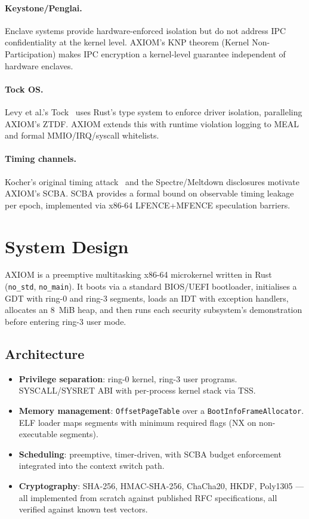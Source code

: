 \documentclass[10pt,twocolumn]{article}
\begin{document}
\paragraph{Keystone/Penglai.} Enclave systems provide hardware-enforced
isolation but do not address IPC confidentiality at the kernel level.
AXIOM's KNP theorem (Kernel Non-Participation) makes IPC encryption a
kernel-level guarantee independent of hardware enclaves.

\paragraph{Tock OS.} Levy et al.'s Tock~\cite{levy2017multiprogramming}
uses Rust's type system to enforce driver isolation, paralleling AXIOM's
ZTDF. AXIOM extends this with runtime violation logging to MEAL and
formal MMIO/IRQ/syscall whitelists.

\paragraph{Timing channels.} Kocher's original timing attack~\cite{kocher1996timing}
and the Spectre/Meltdown disclosures motivate AXIOM's SCBA. SCBA provides
a formal bound on observable timing leakage per epoch, implemented via
x86-64 LFENCE+MFENCE speculation barriers.

\section{System Design}

AXIOM is a preemptive multitasking x86-64 microkernel written in Rust
(\texttt{no\_std}, \texttt{no\_main}). It boots via a standard BIOS/UEFI
bootloader, initialises a GDT with ring-0 and ring-3 segments, loads an IDT
with exception handlers, allocates an 8~MiB heap, and then runs each security
subsystem's demonstration before entering ring-3 user mode.

\subsection{Architecture}

\begin{itemize}
  \item \textbf{Privilege separation}: ring-0 kernel, ring-3 user programs.
        SYSCALL/SYSRET ABI with per-process kernel stack via TSS.
  \item \textbf{Memory management}: \texttt{OffsetPageTable} over a
        \texttt{BootInfoFrameAllocator}. ELF loader maps segments with
        minimum required flags (NX on non-executable segments).
  \item \textbf{Scheduling}: preemptive, timer-driven, with SCBA budget
        enforcement integrated into the context switch path.
  \item \textbf{Cryptography}: SHA-256, HMAC-SHA-256, ChaCha20, HKDF,
        Poly1305 --- all implemented from scratch against published RFC
        specifications, all verified against known test vectors.
\end{itemize}
\end{document}
